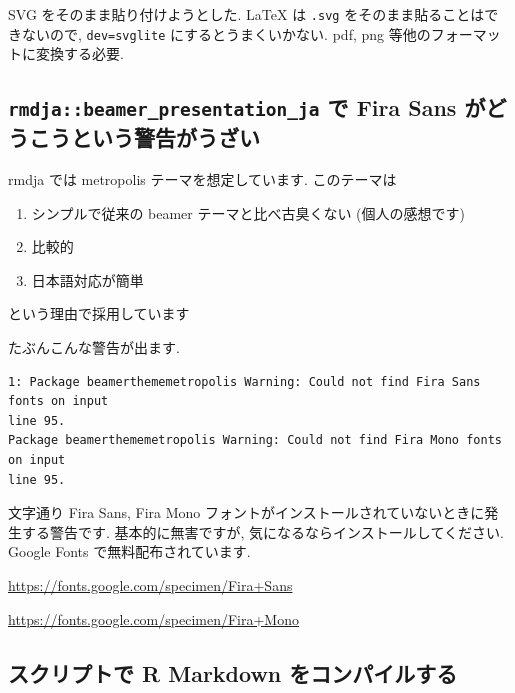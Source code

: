 \documentclass[
]{bxjsarticle}
\providecommand{\tightlist}{%
  \setlength{\itemsep}{0pt}\setlength{\parskip}{0pt}}
\begin{document}
SVG をそのまま貼り付けようとした. LaTeX は \texttt{.svg} をそのまま貼ることはできないので, \texttt{dev=svglite} にするとうまくいかない. pdf, png 等他のフォーマットに変換する必要.

\hypertarget{rmdjabeamer_presentation_ja-ux3067-fira-sans-ux304cux3069ux3046ux3053ux3046ux3068ux3044ux3046ux8b66ux544aux304cux3046ux3056ux3044}{%
\subsection{\texorpdfstring{\texttt{rmdja::beamer\_presentation\_ja} で Fira Sans がどうこうという警告がうざい}{rmdja::beamer\_presentation\_ja で Fira Sans がどうこうという警告がうざい}}\label{rmdjabeamer_presentation_ja-ux3067-fira-sans-ux304cux3069ux3046ux3053ux3046ux3068ux3044ux3046ux8b66ux544aux304cux3046ux3056ux3044}}

rmdja では metropolis テーマを想定しています. このテーマは

\begin{enumerate}
\def\labelenumi{\arabic{enumi}.}
\tightlist
\item
  シンプルで従来の beamer テーマと比べ古臭くない (個人の感想です)
\item
  比較的
\item
  日本語対応が簡単
\end{enumerate}

という理由で採用しています

たぶんこんな警告が出ます.

\begin{verbatim}
1: Package beamerthememetropolis Warning: Could not find Fira Sans fonts on input 
line 95.
Package beamerthememetropolis Warning: Could not find Fira Mono fonts on input 
line 95.
\end{verbatim}

文字通り Fira Sans, Fira Mono フォントがインストールされていないときに発生する警告です. 基本的に無害ですが, 気になるならインストールしてください. Google Fonts で無料配布されています.

\url{https://fonts.google.com/specimen/Fira+Sans}

\url{https://fonts.google.com/specimen/Fira+Mono}

\hypertarget{ux30b9ux30afux30eaux30d7ux30c8ux3067-r-markdown-ux3092ux30b3ux30f3ux30d1ux30a4ux30ebux3059ux308b}{%
\subsection{スクリプトで R Markdown をコンパイルする}\label{ux30b9ux30afux30eaux30d7ux30c8ux3067-r-markdown-ux3092ux30b3ux30f3ux30d1ux30a4ux30ebux3059ux308b}}
\end{document}
